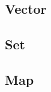 \documentclass{report}
\begin{document}
\subsection{Vector}
\subsection{Set}
\subsection{Map}



% 
% 

\end{document}
